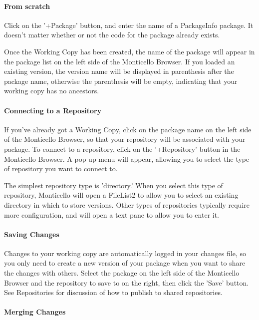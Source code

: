 \documentclass[a4paper,10pt,twoside]{book}
\begin{document}
\paragraph{From scratch}

Click on the '+Package' button, and enter the name of a PackageInfo package. It doesn't matter whether or not the code for the package already exists.

Once the Working Copy has been created, the name of the package will appear in the package list on the left side of the Monticello Browser. If you loaded an existing version, the version name will be displayed in parenthesis after the package name, otherwise the parenthesis will be empty, indicating that your working copy has no ancestors.

\paragraph{Connecting to a Repository}

If you've already got a Working Copy, click on the package name on the left side of the Monticello Browser, so that your repository will be associated with your package. To connect to a repository, click on the '+Repository' button in the Monticello Browser. A pop-up menu will appear, allowing you to select the type of repository you want to connect to.

The simplest repository type is 'directory.' When you select this type of repository, Monticello will open a FileList2 to allow you to select an existing directory in which to store versions. Other types of repositories typically require more configuration, and will open a text pane to allow you to enter it.

\paragraph{Saving Changes}

Changes to your working copy are automatically logged in your changes file, so you only need to create a new version of your package when you want to share the changes with others. Select the package on the left side of the Monticello Browser and the repository to save to on the right, then click the 'Save' button. See Repositories for discussion of how to publish to shared repositories.

\paragraph{Merging Changes}
\end{document}
